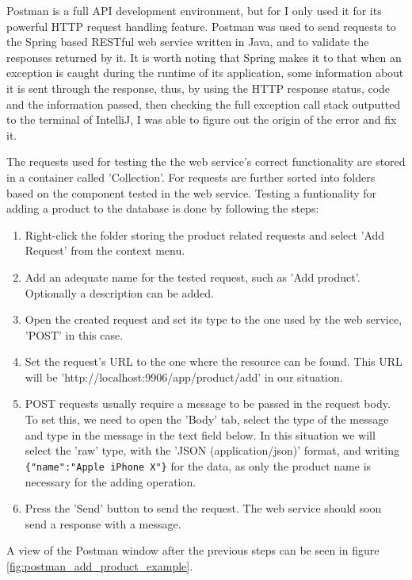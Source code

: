 \documentclass[12pt,a4paper,twoside]{report}
\begin{document}
Postman is a full API development environment, but for I only used it for its powerful HTTP request handling feature. Postman was used to send requests to the Spring based RESTful web service written in Java, and to validate the responses returned by it. It is worth noting that Spring makes it to that when an exception is caught during the runtime of its application, some information about it is sent through the response, thus, by using the HTTP response status, code and the information passed, then checking the full exception call stack outputted to the terminal of IntelliJ, I was able to figure out the origin of the error and fix it.

The requests used for testing the the web service's correct functionality are stored in a container called 'Collection'. For requests are further sorted into folders based on the component tested in the web service. Testing a funtionality for adding a product to the database is done by following the steps:

\begin{enumerate}
  \item Right-click the folder storing the product related requests and select 'Add Request' from the context menu.
  \item Add an adequate name for the tested request, such as 'Add product'. Optionally a description can be added.
  \item Open the created request and set its type to the one used by the web service, 'POST' in this case.
  \item Set the request's URL to the one where the resource can be found. This URL will be 'http://localhost:9906/app/product/add' in our situation.
  \item POST requests usually require a message to be passed in the request body. To set this, we need to open the 'Body' tab, select the type of the message and type in the message in the text field below. In this situation we will select the 'raw' type, with the 'JSON (application/json)' format, and writing \lstinline${"name":"Apple iPhone X"}$ for the data, as only the product name is necessary for the adding operation.
  \item Press the 'Send' button to send the request. The web service should soon send a response with a message.
\end{enumerate}

A view of the Postman window after the previous steps can be seen in figure \ref{fig:postman_add_product_example}.
\end{document}
